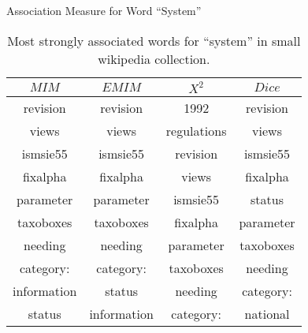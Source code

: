\begin{table}[!htbp]
	\caption{Association Measure for Word ``System''} \label{tab:system}
	\begin{center}
	\vspace{-5mm}
		\begin{tabular}{ c | c | c | c }
			\toprule
			$MIM$ & $EMIM$ & $X^2$ & $Dice$\\
			\midrule
revision     &   revision   &     1992         &   revision       \\
views        &   views      &     regulations  &   views          \\
ismsie55     &   ismsie55   &     revision     &   ismsie55       \\
fixalpha     &   fixalpha   &     views        &   fixalpha       \\
parameter    &   parameter  &     ismsie55     &   status         \\
taxoboxes    &   taxoboxes  &     fixalpha     &   parameter      \\
needing      &   needing    &     parameter    &   taxoboxes      \\
category:    &   category:  &     taxoboxes    &   needing        \\
information  &   status     &     needing      &   category:      \\
status       &   information  &   category:    &   national     \\
			\bottomrule
		\end{tabular}
	\caption*{\scriptsize Most strongly associated words for ``system'' in small wikipedia collection.}
	 \end{center}
\end{table}

